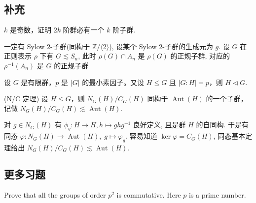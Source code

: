 
\subsection{补充}

\setcounter{pb}{1}
\begin{problem}
    $k$ 是奇数，证明 $2k$ 阶群必有一个 $k$ 阶子群.
\end{problem}

\begin{vain}
    一定有 Sylow $2$-子群(同构于 $\mathbb{Z}/\langle 2 \rangle$), 设某个 Sylow $2$-子群的生成元为 $g$. 
    设 $G$ 在正则表示 $\rho$ 下有 $G \lesssim S_{n}$, 
    此时 $\rho(G)\cap A_{n}$ 是 $\rho(G)$ 的正规子群, 
    对应的 $\rho^{-1}(A_{n})$ 是 $G$ 的正规子群
\end{vain}

\setcounter{pb}{3}
\begin{problem}
    设 $G $ 是有限群，$p $ 是 $|G| $ 的最小素因子。又设 $H \leq G $ 且 $|G:H| = p $，则 $H \vartriangleleft G $. 
\end{problem}

\setcounter{pb}{4}
\begin{problem}
    (N/C 定理) 设 $H \leq G$，则 $N_G(H) / C_G(H)$ 同构于 $\operatorname{Aut}(H)$ 的一个子群，记做 $N_G(H) / C_G(H) \lesssim \operatorname{Aut}(H)$.
\end{problem}

\begin{solution}
    对 $g\in N_G(H)$ 有 $\phi_{g}\colon H\to H, h\mapsto g h g^{-1}$ 良好定义, 且是群 $H$ 的自同构. 于是有同态 $\varphi  \colon N_{G}(H)\to \operatorname{Aut}(H),\; g\mapsto \varphi_g$. 
    容易知道 $\ker\varphi=C_{G}(H)$, 同态基本定理给出 $N_G(H) / C_G(H) \lesssim \operatorname{Aut}(H)$.
\end{solution}

\subsection{更多习题}

\setcounter{pb}{5}

\begin{problem}
    Prove that all the groups of order $p^{2}$ is commutative. Here $p$ is a prime number.
\end{problem}

